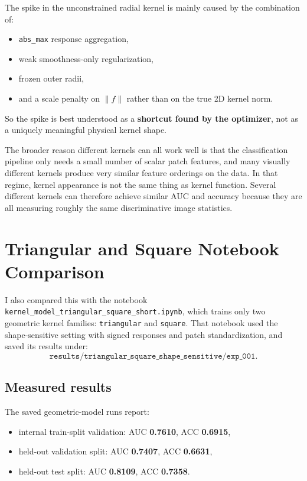 \documentclass{article}
\begin{document}
The spike in the unconstrained radial kernel is mainly caused by the combination of:
\begin{itemize}
    \item \texttt{abs\_max} response aggregation,
    \item weak smoothness-only regularization,
    \item frozen outer radii,
    \item and a scale penalty on \(\lVert f\rVert\) rather than on the true 2D kernel norm.
\end{itemize}

So the spike is best understood as a \textbf{shortcut found by the optimizer}, not as a uniquely meaningful physical kernel shape.

The broader reason different kernels can all work well is that the classification pipeline only needs a small number of scalar patch features, and many visually different kernels produce very similar feature orderings on the data. In that regime, kernel appearance is not the same thing as kernel function. Several different kernels can therefore achieve similar AUC and accuracy because they are all measuring roughly the same discriminative image statistics.

\section*{Triangular and Square Notebook Comparison}

I also compared this with the notebook \texttt{kernel\_model\_triangular\_square\_short.ipynb}, which trains only two geometric kernel families: \texttt{triangular} and \texttt{square}. That notebook used the shape-sensitive setting with signed responses and patch standardization, and saved its results under:
\[
\texttt{results/triangular\_square\_shape\_sensitive/exp\_001}.
\]

\subsection*{Measured results}
The saved geometric-model runs report:
\begin{itemize}
    \item internal train-split validation: AUC \textbf{0.7610}, ACC \textbf{0.6915},
    \item held-out validation split: AUC \textbf{0.7407}, ACC \textbf{0.6631},
    \item held-out test split: AUC \textbf{0.8109}, ACC \textbf{0.7358}.
\end{itemize}
\end{document}
